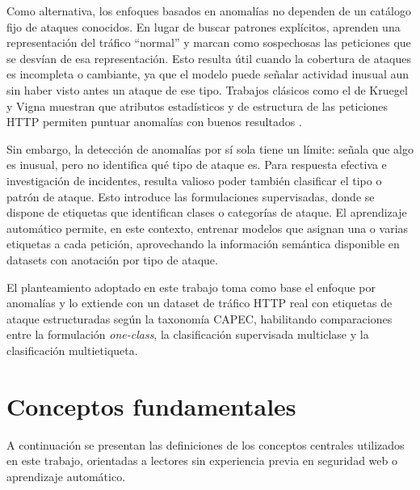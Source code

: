 \documentclass[12pt,oneside]{report}
\begin{document}
Como alternativa, los enfoques basados en anomalías no dependen de un catálogo fijo de ataques conocidos. En lugar de buscar patrones explícitos, aprenden una representación del tráfico ``normal'' y marcan como sospechosas las peticiones que se desvían de esa representación. Esto resulta útil cuando la cobertura de ataques es incompleta o cambiante, ya que el modelo puede señalar actividad inusual aun sin haber visto antes un ataque de ese tipo. Trabajos clásicos como el de Kruegel y Vigna muestran que atributos estadísticos y de estructura de las peticiones HTTP permiten puntuar anomalías con buenos resultados \cite{kruegel_vigna_2003}.

Sin embargo, la detección de anomalías por sí sola tiene un límite: señala que algo es inusual, pero no identifica qué tipo de ataque es. Para respuesta efectiva e investigación de incidentes, resulta valioso poder también clasificar el tipo o patrón de ataque. Esto introduce las formulaciones supervisadas, donde se dispone de etiquetas que identifican clases o categorías de ataque. El aprendizaje automático permite, en este contexto, entrenar modelos que asignan una o varias etiquetas a cada petición, aprovechando la información semántica disponible en datasets con anotación por tipo de ataque.

El planteamiento adoptado en este trabajo toma como base el enfoque por anomalías y lo extiende con un dataset de tráfico HTTP real con etiquetas de ataque estructuradas según la taxonomía CAPEC, habilitando comparaciones entre la formulación \textit{one-class}, la clasificación supervisada multiclase y la clasificación multietiqueta.

\section{Conceptos fundamentales}

A continuación se presentan las definiciones de los conceptos centrales utilizados en este trabajo, orientadas a lectores sin experiencia previa en seguridad web o aprendizaje automático.
\end{document}
